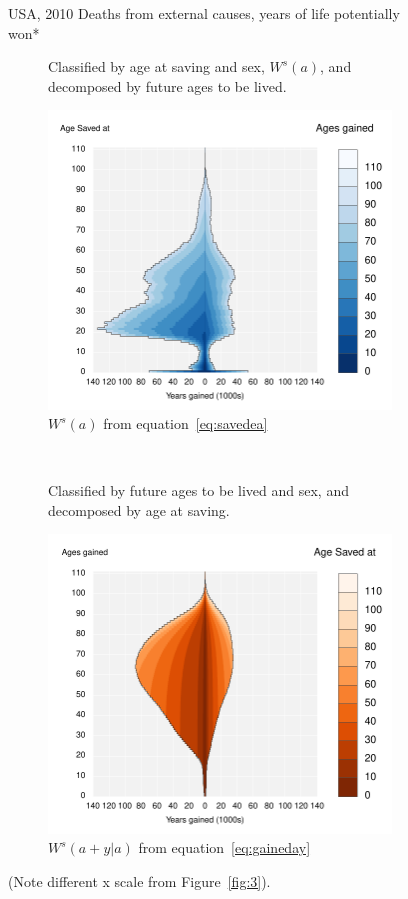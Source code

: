 \documentclass{article}
\begin{document}
\begin{figure}
\centering
\caption{USA, 2010 Deaths from external causes, years of life potentially won*}
\label{fig:4}
\begin{subfigure}[b]{.48\linewidth}
\centering
	\caption{Classified by age at saving and sex, $W^s(a)$, and decomposed by
	future ages to be lived.}
	\label{fig:SavedGainedUSAExternal}
	\includegraphics[scale=.55]{Figures/YearsSavedGainedxx10USAExternal.pdf}
	\caption*{$W^s(a)$ from equation~\ref{eq:savedea}}	
\end{subfigure}
~
\begin{subfigure}[b]{.48\linewidth}
\centering
    \caption{Classified by future ages to be lived and sex, and decomposed
    by age at saving.}
	\label{fig:LostLivedUSAExternal}
    \includegraphics[scale=.55]{Figures/YearsLostLivedyx10USAExternal.pdf}
    \caption*{$W^s(a+y|a)$ from equation~\ref{eq:gaineday}}	
\end{subfigure}
\caption*{(Note different x scale from Figure~\ref{fig:3}).}
\end{figure}
\end{document}
